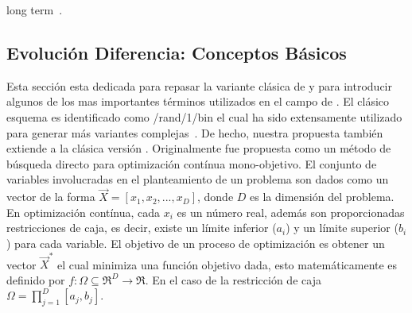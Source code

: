 long term~\cite{montgomery2010analysis}.
\subsection{Evolución Diferencia: Conceptos Básicos}

Esta sección esta dedicada para repasar la variante clásica de \DE{} y para introducir algunos de los mas importantes términos utilizados en el campo de \DE{}.
%
El clásico esquema \DE{} es identificado como \DE{}/rand/1/bin el cual ha sido extensamente utilizado para generar más variantes complejas~\cite{das2011differential}.
%
De hecho, nuestra propuesta también extiende a la clásica versión \DE{}.
%
Originalmente \DE{} fue propuesta como un método de búsqueda directo para optimización contínua mono-objetivo.
%
El conjunto de variables involucradas en el planteamiento de un problema son dados como un vector de la forma $\vec{X} = [x_1, x_2, ..., x_D]$, donde $D$ es la dimensión del problema.
%
En optimización contínua, cada $x_i$ es un número real, además son proporcionadas restricciones de caja, es decir, existe un límite inferior ($a_{i}$) y un límite superior ($b_{i}$) para cada variable.
%
El objetivo de un proceso de optimización es obtener un vector $\vec{X}^*$ el cual minimiza una función objetivo dada, esto matemáticamente es definido por $f : \Omega \subseteq \Re^D \rightarrow \Re$.
%
En el caso de la restricción de caja $\Omega = {\prod}_{j=1}^{D} [a_{j}, b_{j}]$.

